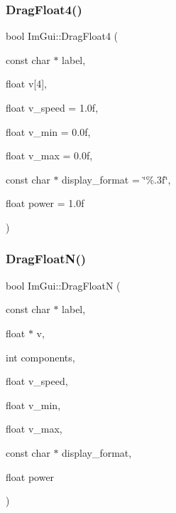 \mbox{\label{namespace_im_gui_a6dfd9e5d7adc6106e9391fc971d2f8bc}} 
\subsubsection{\texorpdfstring{Drag\+Float4()}{DragFloat4()}}
{\footnotesize\ttfamily bool Im\+Gui\+::\+Drag\+Float4 (\begin{DoxyParamCaption}\item[{const char $\ast$}]{label,  }\item[{float}]{v\mbox{[}4\mbox{]},  }\item[{float}]{v\+\_\+speed = {\ttfamily 1.0f},  }\item[{float}]{v\+\_\+min = {\ttfamily 0.0f},  }\item[{float}]{v\+\_\+max = {\ttfamily 0.0f},  }\item[{const char $\ast$}]{display\+\_\+format = {\ttfamily \char`\"{}\%.3f\char`\"{}},  }\item[{float}]{power = {\ttfamily 1.0f} }\end{DoxyParamCaption})}

\mbox{\label{namespace_im_gui_a2a2764b6f0b3291ad0df4d99127dd751}} 
\subsubsection{\texorpdfstring{Drag\+Float\+N()}{DragFloatN()}}
{\footnotesize\ttfamily bool Im\+Gui\+::\+Drag\+FloatN (\begin{DoxyParamCaption}\item[{const char $\ast$}]{label,  }\item[{float $\ast$}]{v,  }\item[{int}]{components,  }\item[{float}]{v\+\_\+speed,  }\item[{float}]{v\+\_\+min,  }\item[{float}]{v\+\_\+max,  }\item[{const char $\ast$}]{display\+\_\+format,  }\item[{float}]{power }\end{DoxyParamCaption})}

\mbox{\label{namespace_im_gui_ad6e3b0e5a2171679c53d6b18e16a460b}} 
